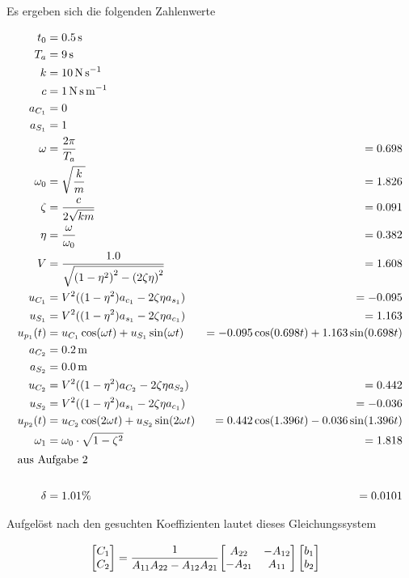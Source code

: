 \begin{solution}
    Es ergeben sich die folgenden Zahlenwerte

    \begin{align*}
        t_0 &= \SI{0.5}{\second}\\
        T_a &= \SI{9}{\second} \\
        k &=  \SI{10}{\newton \per \second} \\
        c &= \SI{1}{\newton \second \per \meter} \\
        a_{C_1} &= 0 \\
        a_{S_1} &= 1 \\
        \omega &= \frac{2 \pi}{T_a} &= 0.698 \\
        \omega_0 &= \sqrt{\frac{k}{m}} &= 1.826\\
        \zeta &= \frac{c}{2 \sqrt{km}} &= 0.091\\
        \eta &= \frac{\omega}{\omega_0} &= 0.382\\
        V &= \frac{1.0}{\sqrt{{(1-\eta^2)}^2 - {(2 \zeta \eta)}^2}} &= 1.608\\
        u_{C_1}  &= V^2 ((1-\eta^2) a_{c_1} - 2 \zeta \eta a_{s_1}) &= -0.095 \\ 
        u_{S_1} &= V^2 ((1-\eta^2) a_{s_1} - 2 \zeta \eta a_{c_1}) &= 1.163 \\  
        u_{p_1}(t) &= u_{C_1} \cos(\omega t) + u_{S_1} \sin(\omega t) &= -0.095 \cos(0.698 t) + 1.163 \sin(0.698 t)\\
        a_{C_2} &= \SI{0.2}{\meter} \\
        a_{S_2} &= \SI{0.0}{\meter} \\
        u_{C_2} &= V^2 ((1-\eta^2) a_{C_2} - 2 \zeta \eta a_{S_2}) &= 0.442\\
        u_{S_2} &= V^2 ((1-\eta^2) a_{s_1} - 2 \zeta \eta a_{c_1}) &= -0.036\\
        u_{p_2}(t) &= u_{C_2} \cos(2\omega t) + u_{S_2} \sin(2\omega t) &= 0.442 \cos(1.396t) -0.036 \sin(1.396 t) \\
        \omega_1 &= \omega_0 \cdot \sqrt{1 - \zeta^2} &= 1.818\\
        \intertext{aus Aufgabe 2} \\
        \delta &= 1.01 \% &= 0.0101\\
    \end{align*}

    Aufgelöst nach den gesuchten Koeffizienten lautet dieses Gleichungssystem

    \begin{align*}
        &\begin{bmatrix}
            C_1 \\
            C_2
        \end{bmatrix}
        = \cfrac{1}{A_{11}A_{22}-A_{12}A_{21}}
        \begin{bmatrix}
            A_{22} & -A_{12}\\
            -A_{21} & A_{11}
        \end{bmatrix}
        \begin{bmatrix}
            b_1 \\
            b_2
        \end{bmatrix}
    \end{align*}


\end{solution}
